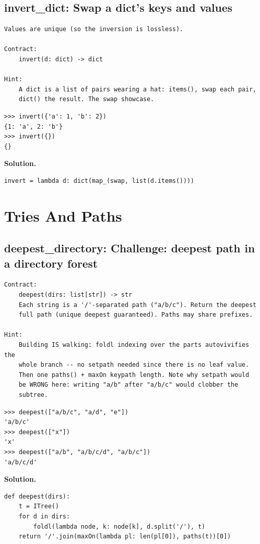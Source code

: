 \documentclass[10pt,letterpaper]{book}
\begin{document}
\section{invert\_dict: Swap a dict's keys and values}
\begin{lstlisting}[style=ex]
Values are unique (so the inversion is lossless).

Contract:
    invert(d: dict) -> dict

Hint:
    A dict is a list of pairs wearing a hat: items(), swap each pair,
    dict() the result. The swap showcase.
\end{lstlisting}
\begin{lstlisting}[style=ex]
>>> invert({'a': 1, 'b': 2})
{1: 'a', 2: 'b'}
>>> invert({})
{}
\end{lstlisting}
\noindent\textbf{Solution.}
\begin{lstlisting}[style=code]
invert = lambda d: dict(map_(swap, list(d.items())))
\end{lstlisting}
\chapter{Tries And Paths}

\section{deepest\_directory: Challenge: deepest path in a directory forest}
\begin{lstlisting}[style=ex]
Contract:
    deepest(dirs: list[str]) -> str
    Each string is a '/'-separated path ("a/b/c"). Return the deepest
    full path (unique deepest guaranteed). Paths may share prefixes.

Hint:
    Building IS walking: foldl indexing over the parts autovivifies the
    whole branch -- no setpath needed since there is no leaf value.
    Then one paths() + maxOn keypath length. Note why setpath would
    be WRONG here: writing "a/b" after "a/b/c" would clobber the
    subtree.
\end{lstlisting}
\begin{lstlisting}[style=ex]
>>> deepest(["a/b/c", "a/d", "e"])
'a/b/c'
>>> deepest(["x"])
'x'
>>> deepest(["a/b", "a/b/c/d", "a/b/c"])
'a/b/c/d'
\end{lstlisting}
\noindent\textbf{Solution.}
\begin{lstlisting}[style=code]
def deepest(dirs):
    t = ITree()
    for d in dirs:
        foldl(lambda node, k: node[k], d.split('/'), t)
    return '/'.join(maxOn(lambda pl: len(pl[0]), paths(t))[0])
\end{lstlisting}
\end{document}
